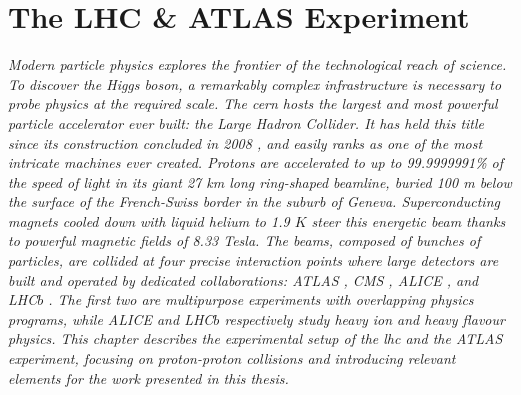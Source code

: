 \chapter{\color{oxfordblue} The LHC \& ATLAS Experiment}\label{chapter-ATLAS}
\ChapFrame

\textit{
Modern particle physics explores the frontier of the technological reach of science. To discover the Higgs boson, a remarkably complex infrastructure is necessary to probe physics at the required scale. The \gls{cern} hosts the largest and most powerful particle accelerator ever built: the Large Hadron Collider. It has held this title since its construction concluded in 2008 \cite{LyndonEvans_2008}, and easily ranks as one of the most intricate machines ever created. Protons are accelerated to up to 99.9999991\% of the speed of light in its giant 27 km long ring-shaped beamline, buried 100 m below the surface of the French-Swiss border in the suburb of Geneva. Superconducting magnets cooled down with liquid helium to 1.9 $K$ steer this energetic beam thanks to powerful magnetic fields of 8.33 Tesla. The beams, composed of bunches of particles, are collided at four precise interaction points where large detectors are built and operated by dedicated collaborations: ATLAS \cite{TheATLASCollaboration_2008}, CMS \cite{TheCMSCollaboration_2008}, ALICE \cite{TheALICECollaboration_2008}, and LHC$b$ \cite{TheLHCbCollaboration_2008}. The first two are multipurpose experiments with overlapping physics programs, while ALICE and LHC$b$ respectively study heavy ion and heavy flavour physics. This chapter describes the experimental setup of the \gls{lhc} and the ATLAS experiment, focusing on proton-proton collisions and introducing relevant elements for the work presented in this thesis.} 

